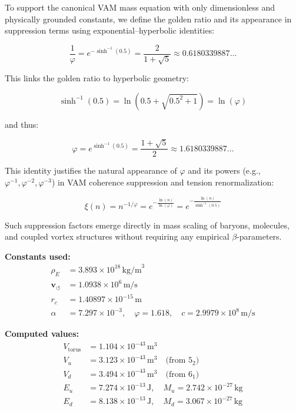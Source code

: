 \documentclass[12pt]{article}
\begin{document}
To support the canonical VAM mass equation with only dimensionless and physically grounded constants, we define the golden ratio and its appearance in suppression terms using exponential–hyperbolic identities:

\[
\boxed{
\frac{1}{\varphi} = e^{-\sinh^{-1}(0.5)} = \frac{2}{1 + \sqrt{5}} \approx 0.6180339887\ldots
}
\]

This links the golden ratio to hyperbolic geometry:

\[
\sinh^{-1}(0.5) = \ln\left( 0.5 + \sqrt{0.5^2 + 1} \right) = \ln(\varphi)
\]

and thus:

\[
\boxed{
\varphi = e^{\sinh^{-1}(0.5)} = \frac{1 + \sqrt{5}}{2} \approx 1.6180339887\ldots
}
\]

This identity justifies the natural appearance of \( \varphi \) and its powers (e.g., \( \varphi^{-1}, \varphi^{-2}, \varphi^{-3} \)) in VAM coherence suppression and tension renormalization:

\[
\boxed{
\xi(n) = n^{-1/\varphi} = e^{-\frac{\ln(n)}{\ln(\varphi)}} = e^{-\frac{\ln(n)}{\sinh^{-1}(0.5)}}
}
\]

Such suppression factors emerge directly in mass scaling of baryons, molecules, and coupled vortex structures without requiring any empirical \( \beta \)-parameters.

\textbf{Constants used:}
\begin{align*}
\rho_{\scriptscriptstyle\boldsymbol\!E}&= 3.893 \times 10^{18} \, \text{kg/m}^3 \\
\mathbf{v}_{\scriptscriptstyle\boldsymbol{\circlearrowleft}} &= 1.0938 \times 10^6 \, \text{m/s} \\
r_c &= 1.40897 \times 10^{-15} \, \text{m} \\
\alpha &= 7.297 \times 10^{-3}, \quad \varphi = 1.618, \quad c = 2.9979 \times 10^8 \, \text{m/s}
\end{align*}

\textbf{Computed values:}
\begin{align*}
V_{\text{torus}} &= 1.104 \times 10^{-43} \, \text{m}^3 \\
V_u &= 3.123 \times 10^{-43} \, \text{m}^3 \quad \text{(from } 5_2 \text{)} \\
V_d &= 3.494 \times 10^{-43} \, \text{m}^3 \quad \text{(from } 6_1 \text{)} \\
E_u &= 7.274 \times 10^{-13} \, \text{J}, \quad M_u = 2.742 \times 10^{-27} \, \text{kg} \\
E_d &= 8.138 \times 10^{-13} \, \text{J}, \quad M_d = 3.067 \times 10^{-27} \, \text{kg}
\end{align*}
\end{document}

